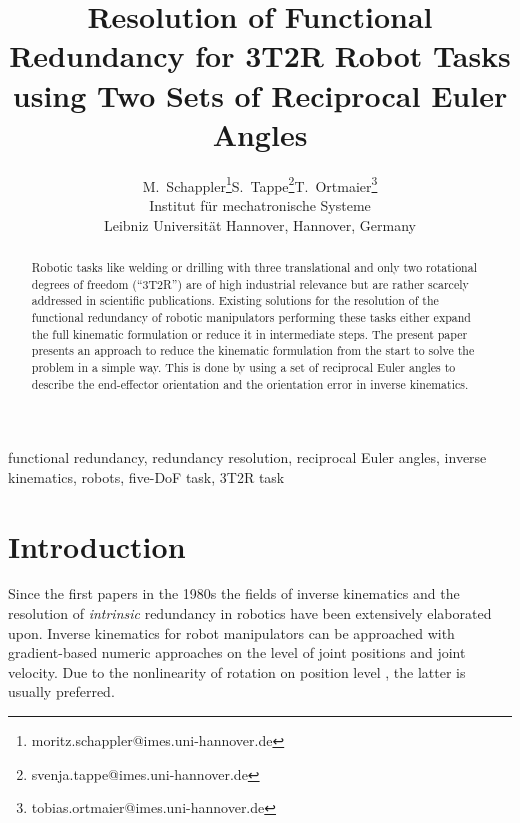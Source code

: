 \documentclass[twocolumn,10pt]{IFTOMM}
\begin{document}
\def\papernumber{IK xxx}
\def\conference_name{15th IFToMM World Congress, Krakow, Poland, 30 June--4 July, 2019}
\title{Resolution of Functional Redundancy for 3T2R Robot Tasks  \\ using Two Sets of Reciprocal Euler Angles}

\author{
    \begin{tabular}{cccc}
    M.\ Schappler\thanks{moritz.schappler@imes.uni-hannover.de}
& S.\ Tappe\thanks{svenja.tappe@imes.uni-hannover.de}
& T.\ Ortmaier\thanks{tobias.ortmaier@imes.uni-hannover.de}\\
    \multicolumn{3}{c}{Institut für mechatronische Systeme} \\
    \multicolumn{3}{c}{Leibniz Universität Hannover, Hannover, Germany}
    \end{tabular}
}

\maketitle

\begin{abstract}
Robotic tasks like welding or drilling with three translational and only two rotational degrees of freedom (``3T2R'') are of high industrial relevance but are rather scarcely addressed in scientific publications.
Existing solutions for the resolution of the functional redundancy of robotic manipulators performing these tasks either expand the full kinematic formulation or reduce it in intermediate steps.
The present paper presents an approach to reduce the kinematic formulation from the start to solve the problem in a simple way.
This is done by using a set of reciprocal Euler angles to describe the end-effector orientation and the orientation error in inverse kinematics.
\end{abstract}

\begin{keywords}
functional redundancy, redundancy resolution, reciprocal Euler angles, inverse kinematics, robots, five-DoF task, 3T2R task
\end{keywords}

\section{Introduction}

Since the first papers in the 1980s the fields of inverse kinematics \cite{GoldenbergBenFen1985} and the resolution of \emph{intrinsic} redundancy \cite{Yoshikawa1984} in robotics have been extensively elaborated upon.
Inverse kinematics for robot manipulators can be approached with gradient-based numeric approaches on the level of joint positions and joint velocity.
Due to the nonlinearity of rotation on position level \cite{GoldenbergBenFen1985}, the latter is usually preferred.
\end{document}
